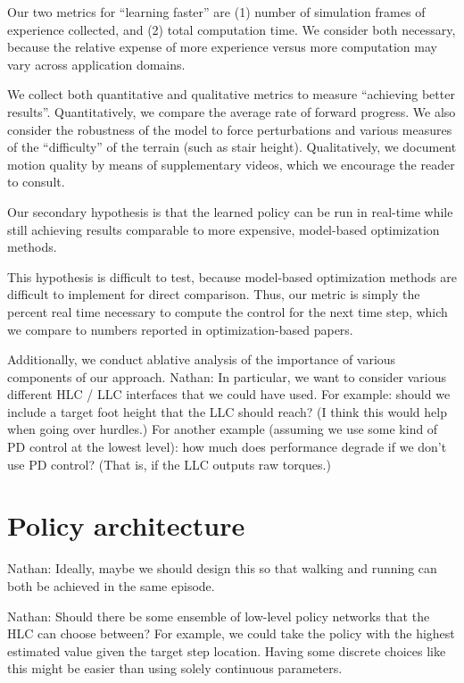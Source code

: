 \documentclass[a4paper]{article}
\newcommand{\nhatch}[1]{{\leavevmode\color{blue} Nathan: #1}}
\begin{document}
Our two metrics for ``learning faster'' are (1) number of simulation frames of experience collected, and (2) total computation time.
We consider both necessary, because the relative expense of more experience versus more computation may vary across application domains.

We collect both quantitative and qualitative metrics to measure ``achieving better results''.
Quantitatively, we compare the average rate of forward progress.
We also consider the robustness of the model to force perturbations and various measures of the ``difficulty'' of the terrain (such as stair height).
Qualitatively, we document motion quality by means of supplementary videos, which we encourage the reader to consult.

Our secondary hypothesis is that the learned policy can be run in real-time while still achieving results comparable to more expensive, model-based optimization methods.

This hypothesis is difficult to test, because model-based optimization methods are difficult to implement for direct comparison.
Thus, our metric is simply the percent real time necessary to compute the control for the next time step, which we compare to numbers reported in optimization-based papers.

Additionally, we conduct ablative analysis of the importance of various components of our approach.
\nhatch{In particular, we want to consider various different HLC / LLC interfaces that we could have used.
For example: should we include a target foot height that the LLC should reach?
(I think this would help when going over hurdles.)
For another example (assuming we use some kind of PD control at the lowest level): how much does performance degrade if we don't use PD control?
(That is, if the LLC outputs raw torques.)}

\section{Policy architecture}

\nhatch{Ideally, maybe we should design this so that walking and running can both be achieved in the same episode.}

\nhatch{Should there be some ensemble of low-level policy networks that the HLC can choose between?
For example, we could take the policy with the highest estimated value given the target step location.
Having some discrete choices like this might be easier than using solely continuous parameters.}
\end{document}
